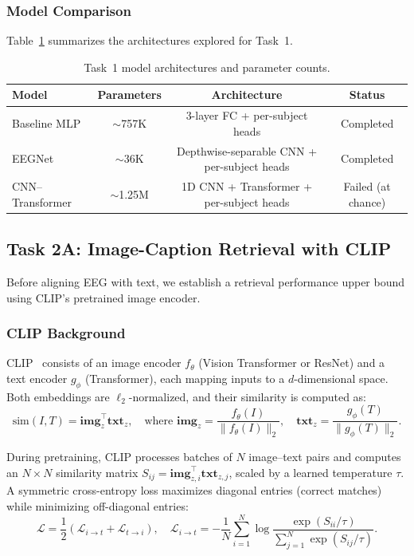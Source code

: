 \documentclass{article}
\begin{document}
\subsubsection{Model Comparison}

Table~\ref{tab:models} summarizes the architectures explored for Task~1.

\begin{table}[h]
  \caption{Task~1 model architectures and parameter counts.}
  \label{tab:models}
  \centering
  \small
  \begin{tabular}{lccc}
    \toprule
    Model & Parameters & Architecture & Status \\
    \midrule
    Baseline MLP       & $\sim$757K  & 3-layer FC + per-subject heads & Completed \\
    EEGNet             & $\sim$36K   & Depthwise-separable CNN + per-subject heads & Completed \\
    CNN--Transformer   & $\sim$1.25M & 1D CNN + Transformer + per-subject heads & Failed (at chance) \\
    \bottomrule
  \end{tabular}
\end{table}

\subsection{Task 2A: Image-Caption Retrieval with CLIP}
\label{sec:clip_retrieval}

Before aligning EEG with text, we establish a retrieval performance upper bound using CLIP's pretrained image encoder.

\subsubsection{CLIP Background}

CLIP~\cite{radford2021clip} consists of an image encoder $f_\theta$ (Vision Transformer or ResNet) and a text encoder $g_\phi$ (Transformer), each mapping inputs to a $d$-dimensional space. Both embeddings are $\ell_2$-normalized, and their similarity is computed as:
\begin{equation}
    \text{sim}(I, T) = \mathbf{img}_z^\top \mathbf{txt}_z, \quad \text{where } \mathbf{img}_z = \frac{f_\theta(I)}{\|f_\theta(I)\|_2}, \quad \mathbf{txt}_z = \frac{g_\phi(T)}{\|g_\phi(T)\|_2}.
\end{equation}

During pretraining, CLIP processes batches of $N$ image--text pairs and computes an $N \times N$ similarity matrix $S_{ij} = \mathbf{img}_{z,i}^\top \mathbf{txt}_{z,j}$, scaled by a learned temperature $\tau$. A symmetric cross-entropy loss maximizes diagonal entries (correct matches) while minimizing off-diagonal entries:
\begin{equation}
    \mathcal{L} = \frac{1}{2}\left(\mathcal{L}_{i \to t} + \mathcal{L}_{t \to i}\right), \quad \mathcal{L}_{i \to t} = -\frac{1}{N}\sum_{i=1}^{N}\log\frac{\exp(S_{ii}/\tau)}{\sum_{j=1}^{N}\exp(S_{ij}/\tau)}.
\end{equation}
\end{document}
